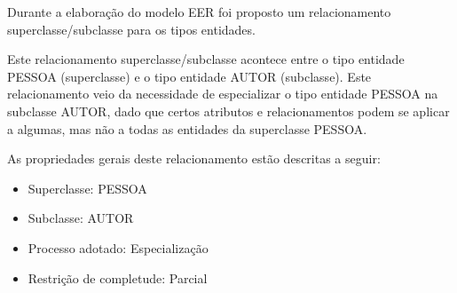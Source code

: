 Durante a elaboração do modelo EER foi proposto um relacionamento superclasse/subclasse para os tipos entidades.

Este relacionamento superclasse/subclasse acontece entre o tipo entidade PESSOA (superclasse) e o tipo entidade AUTOR (subclasse). Este relacionamento veio da necessidade de especializar o tipo entidade PESSOA na subclasse AUTOR, dado que certos atributos e relacionamentos podem se aplicar a algumas, mas não a todas as entidades da superclasse PESSOA.

 As propriedades gerais deste relacionamento estão descritas a seguir:
 \begin{itemize}
				 \item Superclasse: PESSOA
				 \item Subclasse: AUTOR
				 \item Processo adotado: Especialização
				 \item Restrição de completude: Parcial
 \end{itemize}
